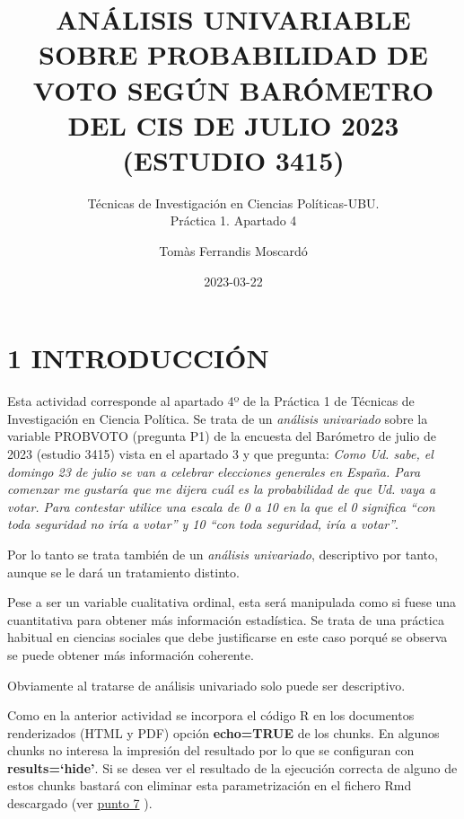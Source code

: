 \documentclass[
  12 pt,
  a4paper,
]{article}
\title{ANÁLISIS UNIVARIABLE SOBRE PROBABILIDAD DE VOTO SEGÚN BARÓMETRO
DEL CIS DE JULIO 2023\\
(ESTUDIO 3415)}
\subtitle{Técnicas de Investigación en Ciencias Políticas-UBU.\\
Práctica 1. Apartado 4}
\author{Tomàs Ferrandis Moscardó}
\date{2023-03-22}
\begin{document}
\maketitle

{
\setcounter{tocdepth}{2}
\tableofcontents
}
\newpage

\renewcommand\tablename{Tabla}

\hypertarget{introducciuxf3n}{%
\section{1 INTRODUCCIÓN}\label{introducciuxf3n}}

Esta actividad corresponde al apartado 4º de la Práctica 1 de Técnicas
de Investigación en Ciencia Política. Se trata de un \emph{análisis
univariado} sobre la variable PROBVOTO (pregunta P1) de la encuesta del
Barómetro de julio de 2023 (estudio 3415) vista en el apartado 3 y que
pregunta: \emph{Como Ud. sabe, el domingo 23 de julio se van a celebrar
elecciones generales en España. Para comenzar me gustaría que me dijera
cuál es la probabilidad de que Ud. vaya a votar. Para contestar utilice
una escala de 0 a 10 en la que el 0 significa ``con toda seguridad no
iría a votar'' y 10 ``con toda seguridad, iría a votar''}.

Por lo tanto se trata también de un \emph{análisis univariado},
descriptivo por tanto, aunque se le dará un tratamiento distinto.

Pese a ser un variable cualitativa ordinal, esta será manipulada como si
fuese una cuantitativa para obtener más información estadística. Se
trata de una práctica habitual en ciencias sociales que debe
justificarse en este caso porqué se observa se puede obtener más
información coherente.

Obviamente al tratarse de análisis univariado solo puede ser
descriptivo.

Como en la anterior actividad se incorpora el código R en los documentos
renderizados (HTML y PDF) opción \textbf{echo=TRUE} de los chunks. En
algunos chunks no interesa la impresión del resultado por lo que se
configuran con \textbf{results=`hide'}. Si se desea ver el resultado de
la ejecución correcta de alguno de estos chunks bastará con eliminar
esta parametrización en el fichero Rmd descargado (ver
\protect\hyperlink{id-github}{punto 7} ).
\end{document}
